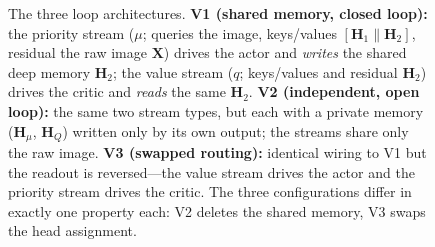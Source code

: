 \begin{figure}[t]

\medskip
\caption{The three loop architectures. \textbf{V1 (shared memory, closed loop):} the priority stream ($\mu$; queries the image, keys/values $[\mathbf{H}_1\parallel\mathbf{H}_2]$, residual the raw image $\mathbf{X}$) drives the actor and \emph{writes} the shared deep memory $\mathbf{H}_2$; the value stream ($q$; keys/values and residual $\mathbf{H}_2$) drives the critic and \emph{reads} the same $\mathbf{H}_2$. \textbf{V2 (independent, open loop):} the same two stream types, but each with a private memory ($\mathbf{H}_{\mu}$, $\mathbf{H}_{Q}$) written only by its own output; the streams share only the raw image. \textbf{V3 (swapped routing):} identical wiring to V1 but the readout is reversed---the value stream drives the actor and the priority stream drives the critic. The three configurations differ in exactly one property each: V2 deletes the shared memory, V3 swaps the head assignment.}
\label{fig:arch}
\end{figure}
